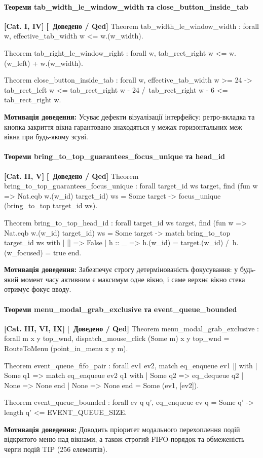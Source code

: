 \documentclass{article}
\let\originalfootnotesize\footnotesize
\let\oldverbatim\verbatim
\let\oldendverbatim\endverbatim
\renewenvironment{verbatim}{\originalfootnotesize\oldverbatim}{\oldendverbatim}
\newcommand{\thmcategory}[1]{{\small\textbf{\color{coreblue}[#1]}}}
\newcommand{\thmproven}{{\small\textbf{\color{productgreen}[\checkmark\ Доведено / Qed]}}}
\newcommand{\thmmotivation}[1]{%
  \par\smallskip\noindent\colorbox{boxbg}{\parbox{\dimexpr\linewidth-2\fboxsep\relax}{%
    \small\textbf{Мотивація доведення:} #1%
  }}\par\medskip
}
\begin{document}
\paragraph{Теореми tab\_width\_le\_window\_width та close\_button\_inside\_tab} \thmcategory{Cat. I, IV} \thmproven
\begin{verbatim}
Theorem tab_width_le_window_width : forall w,
  effective_tab_width w <= w.(w_width).

Theorem tab_right_le_window_right : forall w,
  tab_rect_right w <= w.(w_left) + w.(w_width).

Theorem close_button_inside_tab : forall w,
  effective_tab_width w >= 24 ->
  tab_rect_left w <= tab_rect_right w - 24 /\
  tab_rect_right w - 6 <= tab_rect_right w.
\end{verbatim}
\thmmotivation{Усуває дефекти візуалізації інтерфейсу: ретро-вкладка та кнопка закриття вікна гарантовано знаходяться у межах горизонтальних меж вікна при будь-якому зсуві.}

\paragraph{Теореми bring\_to\_top\_guarantees\_focus\_unique та head\_id} \thmcategory{Cat. II, V} \thmproven
\begin{verbatim}
Theorem bring_to_top_guarantees_focus_unique : forall target_id ws target,
  find (fun w => Nat.eqb w.(w_id) target_id) ws = Some target ->
  focus_unique (bring_to_top target_id ws).

Theorem bring_to_top_head_id : forall target_id ws target,
  find (fun w => Nat.eqb w.(w_id) target_id) ws = Some target ->
  match bring_to_top target_id ws with
  | [] => False
  | h :: _ => h.(w_id) = target.(w_id) /\ h.(w_focused) = true
  end.
\end{verbatim}
\thmmotivation{Забезпечує строгу детермінованість фокусування: у будь-який момент часу активним є максимум одне вікно, і саме верхнє вікно стека отримує фокус вводу.}

\paragraph{Теореми menu\_modal\_grab\_exclusive та event\_queue\_bounded} \thmcategory{Cat. III, VI, IX} \thmproven
\begin{verbatim}
Theorem menu_modal_grab_exclusive : forall m x y top_wnd,
  dispatch_mouse_click (Some m) x y top_wnd = RouteToMenu (point_in_menu x y m).

Theorem event_queue_fifo_pair : forall ev1 ev2,
  match eq_enqueue ev1 [] with
  | Some q1 => match eq_enqueue ev2 q1 with
               | Some q2 => eq_dequeue q2
               | None => None end
  | None => None
  end = Some (ev1, [ev2]).

Theorem event_queue_bounded : forall ev q q',
  eq_enqueue ev q = Some q' ->
  length q' <= EVENT_QUEUE_SIZE.
\end{verbatim}
\thmmotivation{Доводить пріоритет модального перехоплення подій відкритого меню над вікнами, а також строгий FIFO-порядок та обмеженість черги подій TIP (256 елементів).}
\end{document}
